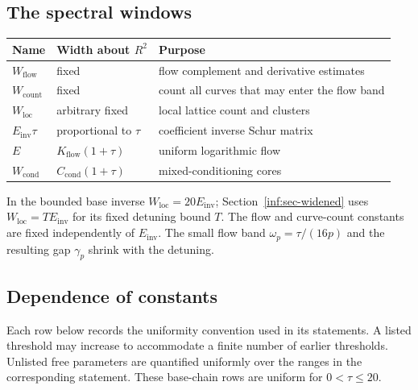\noindent\begin{minipage}{\textwidth}
\subsection*{The spectral windows}
\begin{center}
\begin{tabular}{@{}lll@{}}
\toprule Name & Width about $R^2$ & Purpose\\\midrule
$W_{\mathrm{flow}}$ & fixed & flow complement and derivative estimates\\
$W_{\mathrm{count}}$ & fixed & count all curves that may enter the flow band\\
$W_{\mathrm{loc}}$ & arbitrary fixed & local lattice count and clusters\\
$E_{\mathrm{inv}}\tau$ & proportional to $\tau$ & coefficient inverse Schur matrix\\
$E$ & $K_{\mathrm{flow}}(1+\tau)$ & uniform logarithmic flow\\
$W_{\mathrm{cond}}$ & $C_{\mathrm{cond}}(1+\tau)$ & mixed-conditioning cores\\
\bottomrule
\end{tabular}
\end{center}
\end{minipage}\par

In the bounded base inverse $W_{\mathrm{loc}}=20E_{\mathrm{inv}}$;
Section~\ref{inf:sec-widened} uses $W_{\mathrm{loc}}=TE_{\mathrm{inv}}$
for its fixed detuning bound $T$.
The flow and curve-count constants are fixed independently of
$E_{\mathrm{inv}}$. The small flow band $\omega_p=\tau/(16p)$
and the resulting gap $\gamma_p$ shrink with the detuning.

\subsection*{Dependence of constants}

Each row below records the uniformity convention used in its
statements. A listed threshold may increase to accommodate a
finite number of earlier thresholds. Unlisted free parameters
are quantified uniformly over the ranges in the corresponding
statement. These base-chain rows are uniform for $0<\tau\le20$.

